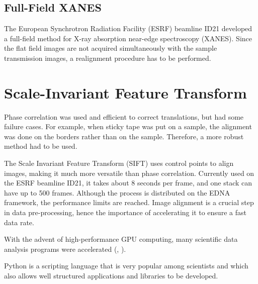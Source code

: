 \documentclass[preprint]{iucr}
\begin{document}
\subsection{Full-Field XANES}
The European Synchrotron Radiation Facility (ESRF) beamline ID21 developed a full-field method for X-ray absorption near-edge spectroscopy\cite{fullfield} (XANES). %
Since the flat field images are not acquired simultaneously with the sample transmission images, a realignment procedure has to be performed.

 


\section{Scale-Invariant Feature Transform}
Phase correlation was used and efficient to correct translations, but had some failure cases. For example, when sticky tape was put on a sample, the alignment was done on the borders rather than on the sample. Therefore, a more robust method had to be used.

The Scale Invariant Feature Transform\cite{lowe2004} (SIFT) uses control points to align images, making it much more versatile than phase correlation. Currently used on the ESRF beamline ID21, it takes about 8 seconds per frame, and one stack can have up to 500 frames. Although the process is distributed on the EDNA\cite{edna} framework, the performance limits are reached. Image alignment is a crucial step in data pre-processing, hence the importance of accelerating it to ensure a fast data rate.

With the advent of high-performance GPU computing, many scientific data analysis programs were accelerated (\cite{pyfai}, \cite{Favre-Nicolin}). %




Python \cite{python} is a scripting language that is very popular among scientists
and which also allows well structured applications and libraries to be developed.










\end{document}

